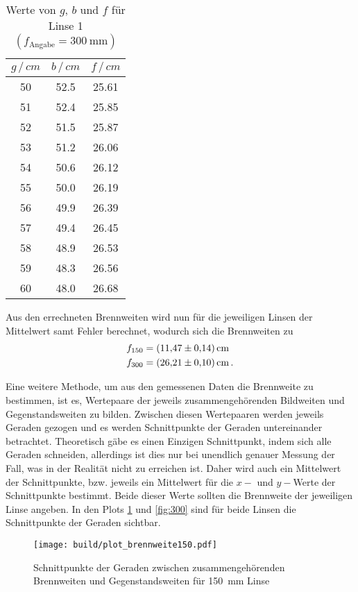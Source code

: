 \begin{table}
    \centering
    \caption{Werte von $g$, $b$ und $f$ für Linse 1 $(f_\text{Angabe}=\SI{300}{\mm})$}
    \begin{tabular}{c c c}
    \toprule
    $g\,/\,cm$ & $b\,/\,cm$ & $f\,/\,cm$ \\
    \midrule
    50 & 52.5 & 25.61 \\
    51 & 52.4 & 25.85 \\
    52 & 51.5 & 25.87 \\
    53 & 51.2 & 26.06 \\
    54 & 50.6 & 26.12 \\
    55 & 50.0 & 26.19 \\
    56 & 49.9 & 26.39 \\
    57 & 49.4 & 26.45 \\
    58 & 48.9 & 26.53 \\
    59 & 48.3 & 26.56 \\
    60 & 48.0 & 26.68 \\
    \bottomrule
    \end{tabular}
    \label{tab:f300}
\end{table}

Aus den errechneten Brennweiten wird nun für die jeweiligen Linsen der Mittelwert samt Fehler berechnet, wodurch sich die 
Brennweiten zu
\begin{align*}
    f_{150} &= \SI{11.47+-0.14}{\centi\metre} \\
    f_{300} &= \SI{26.21+-0.10}{\centi\metre} \, .
\end{align*}

Eine weitere Methode, um aus den gemessenen Daten die Brennweite zu bestimmen, ist es, Wertepaare der jeweils zusammengehörenden
Bildweiten und Gegenstandsweiten zu bilden. Zwischen diesen Wertepaaren werden jeweils Geraden gezogen und es werden Schnittpunkte
der Geraden untereinander betrachtet. Theoretisch gäbe es einen Einzigen Schnittpunkt, indem sich alle Geraden schneiden, 
allerdings ist dies nur bei unendlich genauer Messung der Fall, was in der Realität nicht zu erreichen ist. Daher wird auch ein 
Mittelwert der Schnittpunkte, bzw. jeweils ein Mittelwert für die $x-$ und $y-$Werte der Schnittpunkte bestimmt. 
Beide dieser Werte sollten die Brennweite der jeweiligen Linse angeben. In den Plots \ref{fig:150} und \ref{fig:300} sind für 
beide Linsen die Schnittpunkte der Geraden sichtbar. 

\begin{figure}
    \centering
    \texttt{[image: build/plot\_brennweite150.pdf]}
    \caption{Schnittpunkte der Geraden zwischen zusammengehörenden Brennweiten und Gegenstandsweiten für \SI{150}{\mm} Linse }
    \label{fig:150}
\end{figure}

